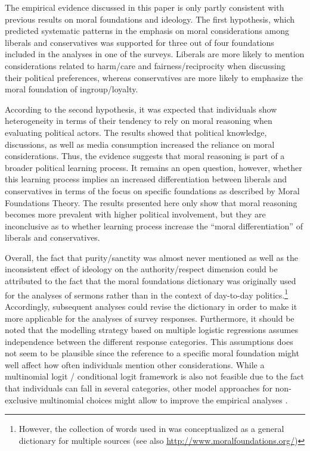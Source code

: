 \documentclass[12pt]{paper}
\begin{document}
The empirical evidence discussed in this paper is only partly consistent with previous results on moral foundations and ideology. The first hypothesis, which predicted systematic patterns in the emphasis on moral considerations among liberals and conservatives was supported for three out of four foundations included in the analyses in one of the surveys. Liberals are more likely to mention considerations related to harm/care and fairness/reciprocity when discussing their political preferences, whereas conservatives are more likely to emphasize the moral foundation of ingroup/loyalty.


According to the second hypothesis, it was expected that individuals show heterogeneity in terms of their tendency to rely on moral reasoning when evaluating political actors. The results showed that political knowledge, discussions, as well as media consumption increased the reliance on moral considerations. Thus, the evidence suggests that moral reasoning is part of a broader political learning process. It remains an open question, however, whether this learning process implies an increased differentiation between liberals and conservatives in terms of the focus on specific foundations as described by Moral Foundations Theory. The results presented here only show that moral reasoning becomes more prevalent with higher political involvement, but they are inconclusive as to whether learning process increase the ``moral differentiation'' of liberals and conservatives.
%
%

Overall, the fact that purity/sanctity was almost never mentioned as well as the inconsistent effect of ideology on the authority/respect dimension could be attributed to the fact that the moral foundations dictionary was originally used for the analyses of sermons rather than in the context of day-to-day politics.\footnote{However, the collection of words used in \citet{graham2009liberals} was conceptualized as a general dictionary for multiple sources (see also \url{http://www.moralfoundations.org/})} Accordingly, subsequent analyses could revise the dictionary in order to make it more applicable for the analyses of survey responses. Furthermore, it should be noted that the modelling strategy based on multiple logistic regressions assumes independence between the different response categories. This assumptions does not seem to be plausible since the reference to a specific moral foundation might well affect how often individuals mention other considerations. While a multinomial logit / conditional logit framework is also not feasible due to the fact that individuals can fall in several categories, other model approaches for non-exclusive multinomial choices might allow to improve the empirical analyses \citep[see for example][]{gilbert2007models}.
\end{document}
